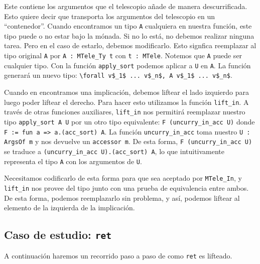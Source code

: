 Este contiene los argumentos que el telescopio añade de manera descurrificada.
Esto quiere decir que transporta los argumentos del telescopio en un ``contenedor''.
Cuando encontramos un tipo \lstinline{A} cualquiera en nuestra función, este tipo puede o no estar bajo la mónada.
Si no lo está, no debemos realizar ninguna tarea.
Pero en el caso de estarlo, debemos modificarlo. Esto signfica reemplazar al tipo original \lstinline{A} por \lstinline{A : MTele_Ty t} con \lstinline{t : MTele}.
Notemos que \lstinline{A} puede ser cualquier tipo.
Con la función \lstinline{apply_sort} podemos aplicar a \lstinline{U} en \lstinline{A}. La función generará un nuevo tipo: \lstinline{\forall v$_1$ ... v$_n$, A v$_1$ ... v$_n$}.

Cuando en \lift encontramos una implicación, debemos liftear el lado izquierdo para luego poder liftear el derecho.
Para hacer esto utilizamos la función \lstinline{lift_in}.
A través de otras funciones auxiliares, \lstinline{lift_in} nos permitirá reemplazar nuestro tipo \lstinline{apply_sort A U} por un otro tipo equivalente: \lstinline{F (uncurry_in_acc U)} donde \lstinline{F := fun a => a.(acc_sort) A}.
La función \lstinline{uncurry_in_acc} toma nuestro \lstinline{U : ArgsOf m} y nos devuelve un \lstinline{accessor m}.
De esta forma, \lstinline{F (uncurry_in_acc U)} se traduce a \lstinline{(uncurry_in_acc U).(acc_sort) A}, lo que intuitivamente representa el tipo \lstinline{A} con los argumentos de \lstinline{U}.

Necesitamos codificarlo de esta forma para que sea aceptado por \lstinline{MTele_In}, y \lstinline{lift_in} nos provee del tipo junto con una prueba de equivalencia entre ambos. De esta forma, podemos reemplazarlo sin problema, y así, podemos liftear al elemento de la izquierda de la implicación.


\subsection{Caso de estudio: \texttt{ret}}

A continuación haremos un recorrido paso a paso de como \lstinline{ret} es lifteado.

